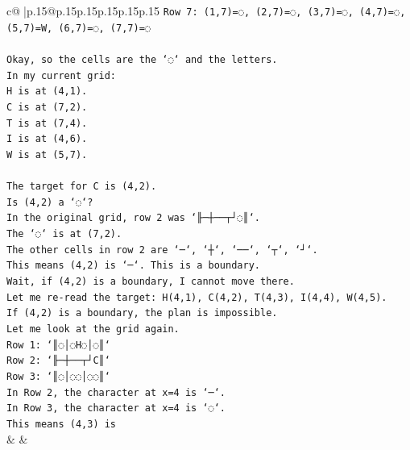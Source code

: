 \documentclass{article}
\begin{document}
{\begin{supertabular}{c@{$\;$}|p{.15\linewidth}@{}p{.15\linewidth}p{.15\linewidth}p{.15\linewidth}p{.15\linewidth}p{.15\linewidth}}
{{{\texttt{Row 7: (1,7)=◌, (2,7)=◌, (3,7)=◌, (4,7)=◌, (5,7)=W, (6,7)=◌, (7,7)=◌} \\
\\ 
\texttt{Okay, so the cells are the `◌` and the letters.} \\
\texttt{In my current grid:} \\
\texttt{H is at (4,1).} \\
\texttt{C is at (7,2).} \\
\texttt{T is at (7,4).} \\
\texttt{I is at (4,6).} \\
\texttt{W is at (5,7).} \\
\\ 
\texttt{The target for C is (4,2).} \\
\texttt{Is (4,2) a `◌`?} \\
\texttt{In the original grid, row 2 was `╟─┼──┬┘◌║`.} \\
\texttt{The `◌` is at (7,2).} \\
\texttt{The other cells in row 2 are `─`, `┼`, `──`, `┬`, `┘`.} \\
\texttt{This means (4,2) is `─`. This is a boundary.} \\
\texttt{Wait, if (4,2) is a boundary, I cannot move there.} \\
\texttt{Let me re{-}read the target: H(4,1), C(4,2), T(4,3), I(4,4), W(4,5).} \\
\texttt{If (4,2) is a boundary, the plan is impossible.} \\
\texttt{Let me look at the grid again.} \\
\texttt{Row 1: `║◌│◌H◌│◌║`} \\
\texttt{Row 2: `╟─┼──┬┘C║`} \\
\texttt{Row 3: `║◌│◌◌│◌◌║`} \\
\texttt{In Row 2, the character at x=4 is `─`.} \\
\texttt{In Row 3, the character at x=4 is `◌`.} \\
\texttt{This means (4,3) is} \\
            }
        }
    }
    & & \\ \\


\end{supertabular}}
\end{document}
